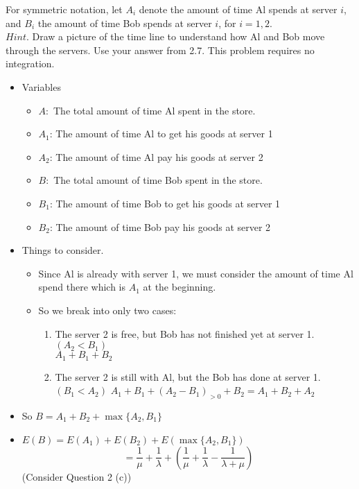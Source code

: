 \documentclass[12pt]{article}
\begin{document}
For symmetric notation, let $A_i$ denote the amount of time Al spends at server $i$, and $B_i$ the amount of time Bob spends at server $i$, for $i=1,2$.\\
$Hint$. Draw a picture of the time line to understand how Al and Bob move through the servers. Use your answer from 2.7. This problem requires no integration.
\begin{itemize}
    \item Variables
\begin{itemize}
    \item $A:$ The total amount of time Al spent in the store.
    \item $A_1$: The amount of time Al to get his goods at server 1 
    \item $A_2$: The amount of time Al pay his goods at server 2
    \item $B:$ The total amount of time Bob spent in the store.
    \item $B_1$: The amount of time Bob to get his goods at server 1
    \item $B_2$: The amount of time Bob pay his goods at server 2
\end{itemize}
    \item Things to consider.
    \begin{itemize}
        \item Since Al is already with server 1, we must consider the amount of time Al spend there which is $A_1$ at the beginning.
        \item So we break into only two cases:
        \begin{enumerate}[label=(\roman*)]
            \item The server 2 is free, but Bob has not finished yet at server 1. $(A_2<B_1)$\\
            $A_1+B_1+B_2$
            \item The server 2 is still with Al, but the Bob has done at server 1. $(B_1<A_2)$
            $A_1+B_1+(A_2-B_1)_{>0} +B_2             =A_1+B_2+A_2$
        \end{enumerate}
        
    \end{itemize}
    
    \item So $B=A_1+B_2+\max\{A_2,B_1\}$
    \item $E(B)=E(A_1)+E(B_2)+ E(\max\{A_2,B_1\}) $
    $$= \frac{1}{\mu}+\frac{1}{\lambda} +\left(\frac{1}{\mu}+\frac{1}{\lambda} -\frac{1}{\lambda+\mu} \right)$$  \hfill (Consider Question 2 (c))
\end{itemize}
\end{document}
